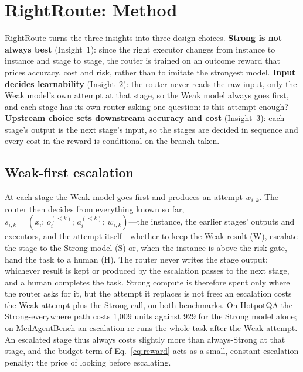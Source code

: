 \documentclass{article}
\newcommand{\W}{\textsc{W}}
\newcommand{\Sg}{\textsc{S}}
\newcommand{\Hm}{\textsc{H}}
\begin{document}
\section{RightRoute: Method}
\label{sec:method}

RightRoute turns the three insights into three design choices. \textbf{Strong is not always best} (Insight~1): since the right executor changes from instance to instance and stage to stage, the router is trained on an outcome reward that prices accuracy, cost and risk, rather than to imitate the strongest model. \textbf{Input decides learnability} (Insight~2): the router never reads the raw input, only the Weak model's own attempt at that stage, so the Weak model always goes first, and each stage has its own router asking one question: is this attempt enough? \textbf{Upstream choice sets downstream accuracy and cost} (Insight~3): each stage's output is the next stage's input, so the stages are decided in sequence and every cost in the reward is conditional on the branch taken.

\subsection{Weak-first escalation}
\label{sec:weakfirst}
At each stage the Weak model goes first and produces an attempt $w_{i,k}$. The router then decides from everything known so far, $s_{i,k}=(x_i;\, o_i^{(<k)};\, a_i^{(<k)};\, w_{i,k})$---the instance, the earlier stages' outputs and executors, and the attempt itself---whether to keep the Weak result (\W), escalate the stage to the Strong model (\Sg) or, when the instance is above the risk gate, hand the task to a human (\Hm). The router never writes the stage output; whichever result is kept or produced by the escalation passes to the next stage, and a human completes the task. Strong compute is therefore spent only where the router asks for it, but the attempt it replaces is not free: an escalation costs the Weak attempt plus the Strong call, on both benchmarks. On HotpotQA the Strong-everywhere path costs 1,009 units against 929 for the Strong model alone; on MedAgentBench an escalation re-runs the whole task after the Weak attempt. An escalated stage thus always costs slightly more than always-Strong at that stage, and the budget term of Eq.~\ref{eq:reward} acts as a small, constant escalation penalty: the price of looking before escalating.
\end{document}

